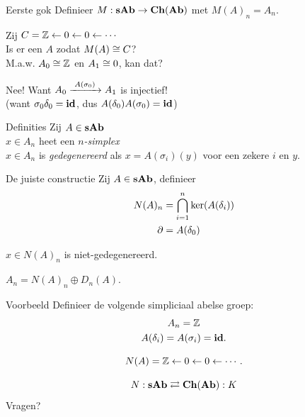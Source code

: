 \documentclass[14pt]{beamer}
\newcommand{\from}{\leftarrow}
\begin{document}
\begin{frame}{Eerste gok}
	Definieer $M: \mathbf{sAb} \to \mathbf{Ch}(\mathbf{Ab})$ met $M(A)_n = A_n$.

	\bigskip\pause
	Zij $C = \Z \from 0 \from 0 \from \cdots$\\
	Is er een $A$ zodat $M(A) \cong C$?\\
	M.a.w. $A_0 \cong \mathbb{Z}$ en $A_1 \cong 0$, kan dat?

	\bigskip\pause
	Nee! Want $A_0 \xrightarrow{\,\,{A(\sigma_0)}\,\,} A_1$ is injectief!\\
	(want $\sigma_0 \delta_0 = \mathbf{id}$, dus $A(\delta_0)A(\sigma_0) = \mathbf{id}$)
\end{frame}

\begin{frame}{Definities}
	Zij $A \in \mathbf{sAb}$ \\
	$x \in A_n$ heet een \emph{$n$-simplex} \\
	$x \in A_n$ is \emph{gedegenereerd} als $x = A(\sigma_i)(y)$ voor een zekere $i$ en $y$.
\end{frame}

\begin{frame}{De juiste constructie}
	Zij $A \in \mathbf{sAb}$, definieer
	\begin{align*}
		N(A)_n &= \bigcap_{i=1}^n \ker(A(\delta_i)) \\
		\partial &= A(\delta_0)
	\end{align*}
	\pause
	\begin{lemma}
		$x \in N(A)_n$ is niet-gedegenereerd.
	\end{lemma}
	\bigskip
	\begin{lemma}
		\centering$ A_n = N(A)_n \oplus D_n(A). $
	\end{lemma}
\end{frame}

\begin{frame}{Voorbeeld}
	Definieer de volgende simpliciaal abelse groep:
	\begin{gather*}
		A_n = \mathbb{Z} \\ 
		A(\delta_i) = A(\sigma_i) = \mathbf{id}.
	\end{gather*}

	\pause
	$$ N(A) = \Z \from 0 \from 0 \from \cdots. $$
\end{frame}

\begin{frame}
	\begin{center}
	$$ N: \mathbf{sAb} \rightleftarrows \mathbf{Ch}(\mathbf{Ab}) :K $$
	\pause\bigskip
	\Huge Vragen?
	\end{center}
\end{frame}
\end{document}
